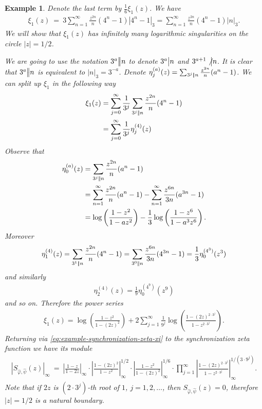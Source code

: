 \documentclass[oneside]{amsart}
\def\divides{{\mathchoice{\mathrel{\bigm|}}{\mathrel{\bigm|}}{\mathrel{|}}{\mathrel{|}}}}
\def\Divides{\divides\!\divides}
\newtheorem{ex}[thm]{Example}
\begin{document}
\begin{ex}
  Denote the last term by $\frac{1}{6}\xi_1(z)$. We have
  \begin{align*}
    \xi_1(z) \ = \ 3\sum_{n=1}^\infty \frac{z^{2n}}{n}(4^n-1)|4^n-1|_3 = \sum_{n=1}^\infty \frac{z^{2n}}{n}(4^n-1)|n|_3.
  \end{align*}
  We will show that $\xi_1(z)$ has infinitely many logarithmic singularities on the circle $|z| = 1/2$.

  We are going to use the notation $3^a \Divides n$ to denote $3^a \divides n$ and $3^{a+1} \not\divides n$.
  It is clear that $3^a \Divides n$ is equivalent to $|n|_3 = 3^{-a}$.
  Denote $\eta_j^{(a)}(z) = \sum_{3^j \Divides n} \frac{z^{2n}}{n}(a^n-1)$.
  We can split up $\xi_1$ in the following way
  \begin{align*}
    \xi_1(z) &= \sum_{j=0}^\infty \frac{1}{3^j} \sum_{3^j \Divides n} \frac{z^{2n}}{n}(4^n-1) \\
    &= \sum_{j=0}^\infty \frac{1}{3^j} \eta_j^{(4)}(z)
  \end{align*}
  Observe that
  \begin{align*}
    \eta_0^{(a)}(z) &= \sum_{3^j \Divides n} \frac{z^{2n}}{n}(a^n-1) \\
    &= \sum_{n=1}^\infty \frac{z^{2n}}{n}(a^n-1) - \sum_{n=1}^\infty \frac{z^{6n}}{3n}(a^{3n} - 1) \\
    &= \log \left( \frac{1-z^2}{1-az^2} \right) - \frac{1}{3} \log \left( \frac{1-z^6}{1-a^3z^6} \right).
  \end{align*}
  Moreover
  \begin{align*}
    \eta_1^{(4)}(z) = \sum_{3^1 \Divides n} \frac{z^{2n}}{n} (4^n-1) = \sum_{3^0 \Divides n} \frac{z^{6n}}{3n}(4^{3n}-1)
    = \frac{1}{3}\eta_0^{(4^3)}(z^3)
  \end{align*}
  and similarly
  \begin{align*}
    \eta_2^{(4)}(z) = \frac{1}{9} \eta_0^{(4^9)}(z^9)
  \end{align*}
  and so on.
  Therefore the power series
  \begin{align*}
    \xi_1(z) = \log \left( \frac{1-z^2}{1-(2z)^2} \right)
      + 2 \sum_{j=1}^\infty \frac{1}{9^j} \log \left( \frac{1-(2z)^{2 \cdot 3^j}}{1-z^{2 \cdot 3^j}} \right).
  \end{align*}
  Returning via \eqref{eq:example-synchronization-zeta-xi} to the synchronization zeta function
  we have its module
  \begin{align*}
    \left|S_{\widehat{\varphi},\widehat{\psi}}(z)\right|_\infty \ = \ \left| \frac{1-z}{1-2z} \right|_\infty
      \cdot \left| \frac{1-(2z)^2}{1-z^2} \right|_\infty^{1/2}
      \cdot \left| \frac{1-z^2}{1-(2z)^2} \right|_\infty^{1/6}
      \cdot \prod_{j=1}^\infty \left| \frac{1-(2z)^{2\cdot3^j}}{1-z^{2\cdot 3^j}} \right|_\infty^{1/(3\cdot 9^j)}.
  \end{align*}
  Note that if $2z$ is $(2\cdot3^j)$-th root of $1$, $j=1,2,\dots$, then $S_{\widehat{\varphi},\widehat{\psi}}(z) = 0$,
  therefore $|z| = 1/2$ is a natural boundary.
\end{ex}
\end{document}
